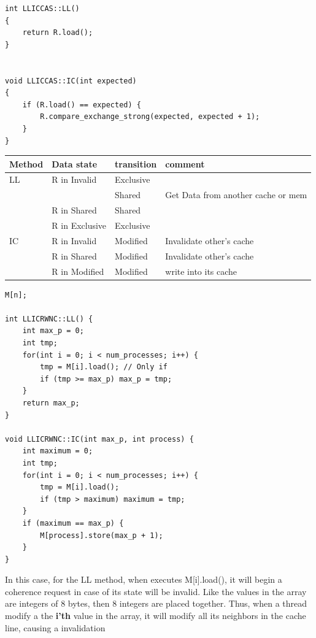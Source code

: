 \documentclass{latex/classes/thesis}
\begin{document}
\lstset{language=c++,label= ,caption= ,captionpos=b,numbers=none}
\begin{lstlisting}
int LLICCAS::LL()
{
    return R.load();
}


void LLICCAS::IC(int expected)
{
    if (R.load() == expected) {
        R.compare_exchange_strong(expected, expected + 1);
    }
}
\end{lstlisting}

\begin{center}
\begin{tabular}{llll}
Method & Data state & transition & comment\\
\hline
LL & R in Invalid & Exclusive & \\
 &  & Shared & Get Data from another cache or mem\\
 & R in Shared & Shared & \\
 & R in Exclusive & Exclusive & \\
IC & R in Invalid & Modified & Invalidate other's cache\\
 & R in Shared & Modified & Invalidate other's cache\\
 & R in Modified & Modified & write into its cache\\
\end{tabular}
\end{center}


\lstset{language=c++,label= ,caption= ,captionpos=b,numbers=none}
\begin{lstlisting}
M[n];

int LLICRWNC::LL() {
    int max_p = 0;
    int tmp;
    for(int i = 0; i < num_processes; i++) {
        tmp = M[i].load(); // Only if
        if (tmp >= max_p) max_p = tmp;
    }
    return max_p;
}

void LLICRWNC::IC(int max_p, int process) {
    int maximum = 0;
    int tmp;
    for(int i = 0; i < num_processes; i++) {
        tmp = M[i].load();
        if (tmp > maximum) maximum = tmp;
    }
    if (maximum == max_p) {
        M[process].store(max_p + 1);
    }
}
\end{lstlisting}

In this case, for the LL method, when executes M[i].load(), it will begin a
coherence request in case of its state will be invalid. Like the values in
the array are integers of 8 bytes, then 8 integers are placed together. Thus,
when a thread modify a the \textbf{i'th} value in the array, it will modify all its
neighbors in the cache line, causing a invalidation
\end{document}
